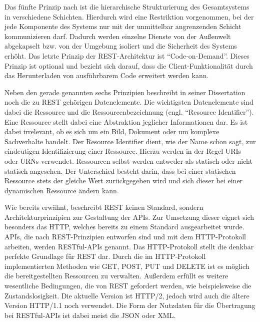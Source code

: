Das fünfte Prinzip nach \citeauthor{MS-Fielding.} ist die hierarchische Strukturierung des Gesamtsystems in verschiedene Schichten. 
Hierdurch wird eine Restriktion vorgenommen, bei der jede Komponente des Systems nur mit der unmittelbar angrenzenden Schicht kommunizieren darf. 
Dadurch werden einzelne Dienste von der Außenwelt abgekapselt bzw. von der Umgebung isoliert und die Sicherheit des Systems erhöht. 
Das letzte Prinzip der \ac{REST}-Architektur ist \enquote{Code-on-Demand}.
Dieses Prinzip ist optional und bezieht sich darauf, dass die Client-Funktionalität durch das Herunterladen von ausführbarem Code erweitert werden kann. 

Neben den gerade genannten sechs Prinzipien beschreibt \citeauthor{MS-Fielding.} in seiner Dissertation noch die zu \ac{REST} gehörigen Datenelemente. 
Die wichtigsten Datenelemente sind dabei die Ressource und die Ressourcenbezeichnung (engl. \enquote{Resource Identifier}). 
Eine Ressource stellt dabei eine Abstraktion jeglicher Informationen dar. 
Es ist dabei irrelevant, ob es sich um ein Bild, Dokument oder um komplexe Sachverhalte handelt. 
Der Resource Identifier dient, wie der Name schon sagt, zur eindeutigen Identifizierung einer Ressource. 
Hierzu werden in der Regel \acp{URI} oder \acp{URN} verwendet. 
Ressourcen selbst werden entweder als statisch oder nicht statisch angesehen.
Der Unterschied besteht darin, dass bei einer statischen Ressource stets der gleiche Wert zurückgegeben wird und sich dieser bei einer dynamischen Ressource ändern kann.\autocite[Vgl.][S. 86-90]{MS-Fielding.}

Wie bereits erwähnt, beschreibt \ac{REST} keinen Standard, sondern Architekturprinzipien zur Gestaltung der \acp{API}. 
Zur Umsetzung dieser eignet sich besonders das \ac{HTTP}, welches bereits zu einem Standard ausgearbeitet wurde. 
\acp{API}, die nach \ac{REST}-Prinzipien entworfen sind und mit dem \ac{HTTP}-Protokoll arbeiten, werden \ac{REST}ful-\acp{API} genannt.\autocite[Vgl.][S. 180]{MS-Wolff.2016}
Das \ac{HTTP}-Protokoll stellt die denkbar perfekte Grundlage für \ac{REST} dar. 
Durch die im \ac{HTTP}-Protokoll implementierten Methoden wie GET, POST, PUT und DELETE ist es möglich die bereitgestellten Ressourcen zu verwalten.
Außerdem erfüllt es weitere wesentliche Bedingungen, die von \ac{REST} gefordert werden, wie beispielsweise die Zustandslosigkeit. 
Die aktuelle Version ist \ac{HTTP}/2\autocite{MS-Belshe.2015}, jedoch wird auch die ältere Version \ac{HTTP}/1.1\autocite{MS-Fielding.1999} noch verwendet. 
Die Form der Nutzdaten für die Übertragung bei \ac{REST}ful-\acp{API} ist dabei meist die \ac{JSON} oder \ac{XML}.\autocite[Vgl.][S. 97]{MS-Tilkov.2015} 


